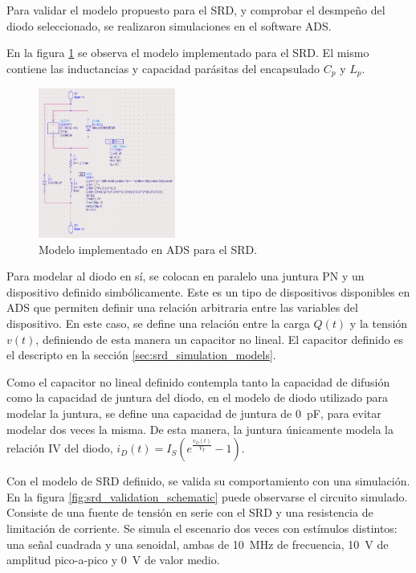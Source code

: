 Para validar el modelo propuesto para el SRD, y comprobar el desmpeño del diodo
seleccionado, se realizaron simulaciones en el software ADS.

En la figura \ref{fig:srd_model_ads} se observa el modelo implementado para el
SRD. El mismo contiene las inductancias y capacidad parásitas del encapsulado
$C_p$ y $L_p$.

\begin{figure}[t]
  \centering
    \includegraphics[width=0.4\textwidth]{images/srd_model_ads.jpg}
    \caption{Modelo implementado en ADS para el SRD.}
    \label{fig:srd_model_ads}
\end{figure}

Para modelar al diodo en sí, se colocan en paralelo una juntura PN y un
dispositivo definido simbólicamente. Este es un tipo de dispositivos disponibles
en ADS que permiten definir una relación arbitraria entre las variables del
dispositivo. En este caso, se define una relación entre la carga $Q(t)$ y la
tensión $v(t)$, definiendo de esta manera un capacitor no lineal. El capacitor
definido es el descripto en la sección \ref{sec:srd_simulation_models}.

Como el capacitor no lineal definido contempla tanto la capacidad de difusión
como la capacidad de juntura del diodo, en el modelo de diodo utilizado para
modelar la juntura, se define una capacidad de juntura de \qty{0}{\pico\farad},
para evitar modelar dos veces la misma. De esta manera, la juntura únicamente
modela la relación IV del diodo, $i_D(t) = I_S \left(
e^{\frac{v_D(t)}{V_T}}-1\right)$.

Con el modelo de SRD definido, se valida su comportamiento con una simulación.
En la figura \ref{fig:srd_validation_schematic} puede observarse el circuito
simulado. Consiste de una fuente de tensión en serie con el SRD y una
resistencia de limitación de corriente. Se simula el escenario dos veces con
estímulos distintos: una señal cuadrada y una senoidal, ambas de
\qty{10}{\mega\hertz} de frecuencia, \qty{10}{\volt} de amplitud pico-a-pico y
\qty{0}{\volt} de valor medio.

